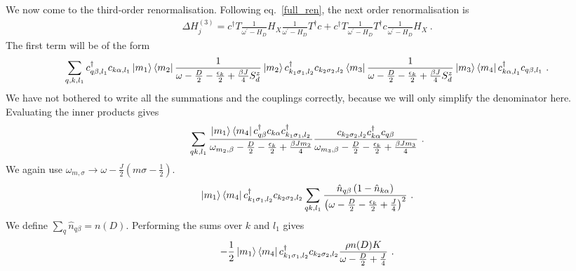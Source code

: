\documentclass[reprint,onecolumn,prb,superscriptaddress]{revtex4-2}
\begin{document}
We now come to the third-order renormalisation.
Following eq.~\ref{full_ren}, the next order renormalisation is
\begin{equation}\begin{aligned}
	\label{psector_3rd_ren}
	\Delta H^{(3)}_j = c^\dagger T \frac{1}{\omega^\prime - H_D} H_X \frac{1}{\omega^\prime - H_D} T^\dagger c + c^\dagger T \frac{1}{\omega^\prime - H_D} T^\dagger c \frac{1}{\omega^\prime - H_D} H_X~.
\end{aligned}\end{equation}
The first term will be of the form
\begin{equation}\begin{aligned}
	\sum_{q,k,l_1} c^\dagger_{q\beta, l_1}c_{k \alpha, l_1}\ket{m_1}\bra{m_2} \frac{1}{\omega - \frac{D}{2} - \frac{\epsilon_k}{2} + \frac{\beta J}{4}S_d^z} \ket{m_2} c^\dagger_{k_1 \sigma_1, l_2}c_{k_2 \sigma_2,l_2} \bra{m_3}\frac{1}{\omega - \frac{D}{2} - \frac{\epsilon_k}{2} + \frac{\beta J}{4}S_d^z}\ket{m_3}\bra{m_4}c^\dagger_{k\alpha, l_1}c_{q\beta, l_1}~.
\end{aligned}\end{equation}
We have not bothered to write all the summations and the couplings correctly, because we will only simplify the denominator here. Evaluating the inner products gives
\begin{equation}\begin{aligned}
	\sum_{qk,l_1} \frac{\ket{m_1}\bra{m_4}c^\dagger_{q\beta}c_{k \alpha}c^\dagger_{k_1 \sigma_1, l_2}}{\omega_{m_2,\beta} - \frac{D}{2} - \frac{\epsilon_k}{2} + \frac{\beta J m_2}{4}}  \frac{c_{k_2 \sigma_2,l_2}c^\dagger_{k\alpha}c_{q\beta}}{\omega_{m_3,\beta} - \frac{D}{2} - \frac{\epsilon_k}{2} + \frac{\beta J m_3}{4}}~.
\end{aligned}\end{equation}
We again use \(\omega_{m,\sigma} \to \omega - \frac{J}{2}\left(m\sigma - \frac{1}{2}\right)\).
\begin{equation}\begin{aligned}
	\ket{m_1}\bra{m_4}c^\dagger_{k_1 \sigma_1, l_2}c_{k_2 \sigma_2,l_2}\sum_{qk,l_1} \frac{\hat n_{q\beta}\left(1 - \hat n_{k\alpha}\right)}{\left(\omega - \frac{D}{2} - \frac{\epsilon_k}{2} + \frac{J}{4}\right)^2}~.
\end{aligned}\end{equation}
We define \(\sum_q \hat n_{q\beta} = n(D)\). Performing the sums over \(k\) and \(l_1\) gives
\begin{equation}\begin{aligned}
	-\frac{1}{2}\ket{m_1}\bra{m_4}c^\dagger_{k_1 \sigma_1, l_2}c_{k_2 \sigma_2,l_2} \frac{\rho n(D) K}{\omega - \frac{D}{2} + \frac{J}{4}}~.
\end{aligned}\end{equation}
\end{document}
